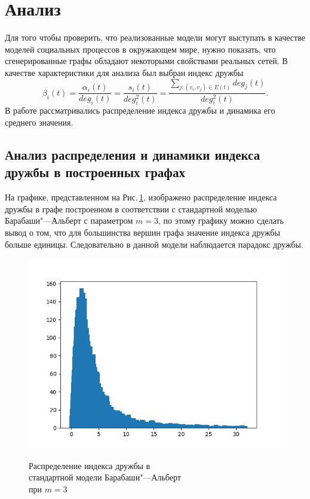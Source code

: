 \documentclass[bachelor, och, diploma]{SCWorks}
\begin{document}
\section{Анализ}
Для того чтобы проверить, что реализованные модели могут выступать в качестве моделей социальных процессов в окружающем мире, нужно показать, что сгенерированные графы обладают некоторыми свойствами реальных сетей. В качестве характеристики для анализа был выбран индекс дружбы 
\[
\beta_i(t) = \dfrac{\alpha_i(t)}{deg_i(t)} = \dfrac{s_i(t)}{deg_i^2 (t)} = \dfrac{\sum_{j: (v_i, v_j ) \in E(t)} deg_j(t)}{deg_i^2 (t)}.
\]
В работе рассматривались распределение индекса дружбы и динамика его среднего значения.
\subsection{Анализ распределения и динамики индекса дружбы в построенных графах}
На графике, представленном на Рис.\,\ref{fig:bas3}, изображено распределение индекса дружбы в графе построенном в соответствии с стандартной моделью Барабаши"---Альберт с параметром $m = 3$, по этому графику можно сделать вывод о том, что для большинства вершин графа значение индекса дружбы больше единицы. Следовательно в данной модели наблюдается парадокс дружбы. 
\begin{figure}[!ht]
\centering
\includegraphics[scale=0.7]{diploma_results/static/ba_dist_beta_3.png}\\
\caption{Распределение индекса дружбы  в\\ стандартной модели Барабаши"---Альберт\\ при $m=3$}\label{fig:bas3}
\end{figure}
\end{document}
